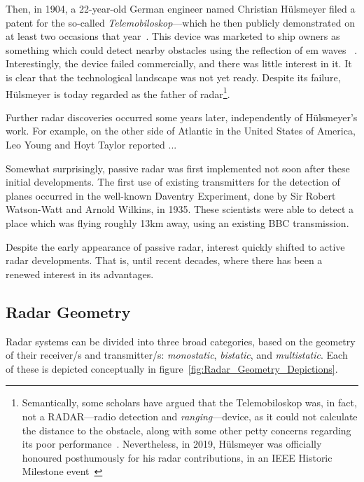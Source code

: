 \documentclass[class=report,11pt,crop=false]{standalone}
\begin{document}
Then, in 1904, a 22-year-old German engineer named Christian H\"ulsmeyer filed a patent for the so-called \emph{Telemobiloskop}---which he then publicly demonstrated on at least two occasions that year~\cite{Galati2014}. This device was marketed to ship owners as something which could detect nearby obstacles using the reflection of \gls{em} waves ~\cite{}. Interestingly, the device failed commercially, and there was little interest in it. It is clear that the technological landscape was not yet ready. Despite its failure, H\"ulsmeyer is today regarded as the father of radar\footnote{Semantically, some scholars have argued that the Telemobiloskop was, in fact, not a RADAR---radio detection and \emph{ranging}---device, as it could not calculate the distance to the obstacle, along with some other petty concerns regarding its poor performance~\cite{pritchard1989radar}. Nevertheless, in 2019, H\"ulsmeyer was officially honoured posthumously for his radar contributions, in an IEEE Historic Milestone event~\cite{Griffiths2019}}.

Further radar discoveries occurred some years later, independently of H\"ulsmeyer's work. For example, on the other side of Atlantic in the United States of America, Leo Young and Hoyt Taylor reported ...

Somewhat surprisingly, passive radar was first implemented not soon after these initial developments. The first use of existing transmitters for the detection of planes occurred in the well-known Daventry Experiment, done by Sir Robert Watson-Watt and Arnold Wilkins, in 1935. These scientists were able to detect a place which was flying roughly 13km away, using an existing BBC transmission.

Despite the early appearance of passive radar, interest quickly shifted to active radar developments. That is, until recent decades, where there has been a renewed interest in its advantages.

\subsection{Radar Geometry}

Radar systems can be divided into three broad categories, based on the geometry of their receiver/s and transmitter/s: \emph{monostatic}, \emph{bistatic}, and \emph{multistatic}. Each of these is depicted conceptually in figure~\ref{fig:Radar_Geometry_Depictions}.
\end{document}
